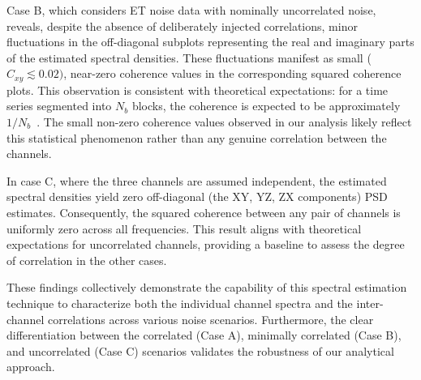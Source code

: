 \documentclass[%
 reprint,
 amsmath,amssymb,
 aps,
 nofootinbib,
]{revtex4-2}
\begin{document}
Case B, which considers ET noise data with nominally uncorrelated noise, reveals, despite the absence of deliberately injected correlations, minor fluctuations in the off-diagonal subplots representing the real and imaginary parts of the estimated spectral densities.
These fluctuations manifest as small ($C_{xy}\lesssim0.02)$, near-zero coherence values in the corresponding squared coherence plots. 
This observation is consistent with theoretical expectations: for a time series segmented into $N_b$ blocks, the coherence is expected to be approximately $1/N_b$~\citeme. 
The small non-zero coherence values observed in our analysis likely reflect this statistical phenomenon rather than any genuine correlation between the channels.

In case C, where the three channels are assumed independent, the estimated spectral densities yield zero off-diagonal (the XY, YZ, ZX components) PSD estimates. 
Consequently, the squared coherence between any pair of channels is uniformly zero across all frequencies. 
This result aligns with theoretical expectations for uncorrelated channels,  providing a baseline to assess the degree of correlation in the other cases.


These findings collectively demonstrate the capability of this spectral estimation technique to characterize both the individual channel spectra and the inter-channel correlations across various noise scenarios. 
Furthermore, the clear differentiation between the correlated (Case A), minimally correlated (Case B), and uncorrelated (Case C) scenarios validates the robustness of our analytical approach.
\end{document}
